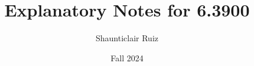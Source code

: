 \documentclass[10pt,oneside]{book}
\title{Explanatory Notes for 6.3900}
\author{Shaunticlair Ruiz}
\date{Fall 2024}
\begin{document}
\maketitle

\setcounter{tocdepth}{2} %
\tableofcontents


 
 
 
 
 
 





 
 

 

 

 







 
 
 


 
 


 




 \begin{appendices}
    \renewcommand{\thechapter}{A}
    

    \renewcommand{\thechapter}{B}
    
    
    \renewcommand{\thechapter}{C}
    

    \renewcommand{\thechapter}{D}
    

 \end{appendices}











% 
% 
%
\end{document}
